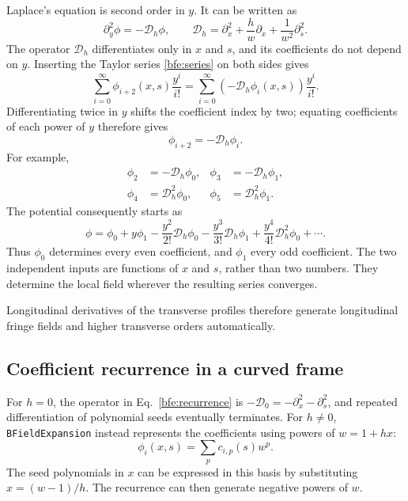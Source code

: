 Laplace's equation is second order in \(y\). It can be written as
\begin{equation}
 \partial_y^2\phi=-\mathcal D_h\phi,\qquad
 \mathcal D_h=\partial_x^2+\frac{h}{w}\partial_x
                         +\frac{1}{w^2}\partial_s^2.
\end{equation}
The operator \(\mathcal D_h\) differentiates only in \(x\) and \(s\),
and its coefficients do not depend on \(y\). Inserting the Taylor series
\eqref{bfe:series} on both sides gives
\begin{equation}
 \sum_{i=0}^{\infty}\phi_{i+2}(x,s)\frac{y^i}{i!}
 =\sum_{i=0}^{\infty}(-\mathcal D_h\phi_i(x,s))\frac{y^i}{i!}.
\end{equation}
Differentiating twice in \(y\) shifts the coefficient index by two;
equating coefficients of each power of \(y\) therefore gives
\begin{equation}
 \boxed{\phi_{i+2}=-\mathcal D_h\phi_i.}
 \label{bfe:recurrence}
\end{equation}
For example,
\begin{align}
 \phi_2&=-\mathcal D_h\phi_0, & \phi_3&=-\mathcal D_h\phi_1,\\
 \phi_4&=\mathcal D_h^2\phi_0, & \phi_5&=\mathcal D_h^2\phi_1.
\end{align}
The potential consequently starts as
\begin{equation}
 \phi=\phi_0+y\phi_1
 -\frac{y^2}{2!}\mathcal D_h\phi_0
 -\frac{y^3}{3!}\mathcal D_h\phi_1
 +\frac{y^4}{4!}\mathcal D_h^2\phi_0+\cdots.
\end{equation}
Thus \(\phi_0\) determines every even coefficient, and \(\phi_1\) every
odd coefficient. The two independent inputs are functions of \(x\) and
\(s\), rather than two numbers. They determine the local field wherever
the resulting series converges.

Longitudinal derivatives of the transverse profiles therefore generate
longitudinal fringe fields and higher transverse orders automatically.

\subsection{Coefficient recurrence in a curved frame}

For \(h=0\), the operator in Eq.~\eqref{bfe:recurrence} is
\(-\mathcal D_0=-\partial_x^2-\partial_s^2\), and repeated differentiation
of polynomial seeds eventually terminates. For \(h\ne0\),
\texttt{BFieldExpansion} instead represents the coefficients using powers
of \(w=1+hx\):
\begin{equation}
 \phi_i(x,s)=\sum_p c_{i,p}(s)w^p.
\end{equation}
The seed polynomials in \(x\) can be expressed in this basis by substituting
\(x=(w-1)/h\). The recurrence can then generate negative powers of \(w\).

